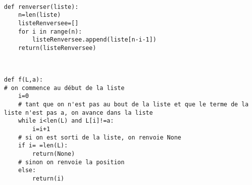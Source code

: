 \begin{solution}~\\
\vspace{-0.7cm}
\begin{verbatim}
def renverser(liste):
    n=len(liste)
    listeRenversee=[]
    for i in range(n):
        listeRenversee.append(liste[n-i-1])
    return(listeRenversee)  
\end{verbatim}
\end{solution}




\begin{solution}~\\
\vspace{-0.7cm}
\begin{verbatim}
def f(L,a):
# on commence au début de la liste
    i=0         
    # tant que on n'est pas au bout de la liste et que le terme de la liste n'est pas a, on avance dans la liste
    while i<len(L) and L[i]!=a:
        i=i+1
    # si on est sorti de la liste, on renvoie None    
    if i= =len(L):
        return(None)
    # sinon on renvoie la position    
    else:
        return(i)                    
\end{verbatim}
\end{solution}



